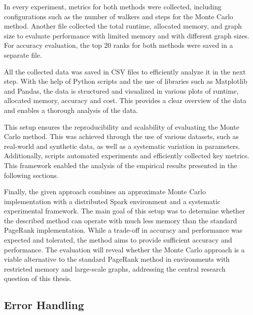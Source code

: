 In every experiment, metrics for both methods were collected, including configurations such as the number of walkers and steps for the Monte Carlo method. Another file collected the total runtime, allocated memory, and graph size to evaluate performance with limited memory and with different graph sizes. For accuracy evaluation, the top 20 ranks for both methods were saved in a separate file. \par
All the collected data was saved in CSV files to efficiently analyze it in the next step. With the help of Python scripts and the use of libraries such as Matplotlib and Pandas, the data is structured and visualized in various plots of runtime, allocated memory, accuracy and cost. This provides a clear overview of the data and enables a thorough analysis of the data. \par
This setup ensures the reproducibility and scalability of evaluating the Monte Carlo method. This was achieved through the use of various datasets, such as real-world and synthetic data, as well as a systematic variation in parameters. Additionally, scripts automated experiments and efficiently collected key metrics. This framework enabled the analysis of the empirical results presented in the following sections. \par
Finally, the given approach combines an approximate Monte Carlo implementation with a distributed Spark environment and a systematic experimental framework. The main goal of this setup was to determine whether the described method can operate with much less memory than the standard PageRank implementation. While a trade-off in accuracy and performance was expected and tolerated, the method aims to provide sufficient accuracy and performance. The evaluation will reveal whether the Monte Carlo approach is a viable alternative to the standard PageRank method in environments with restricted memory and large-scale graphs, addressing the central research question of this thesis.


\subsection{Error Handling}

